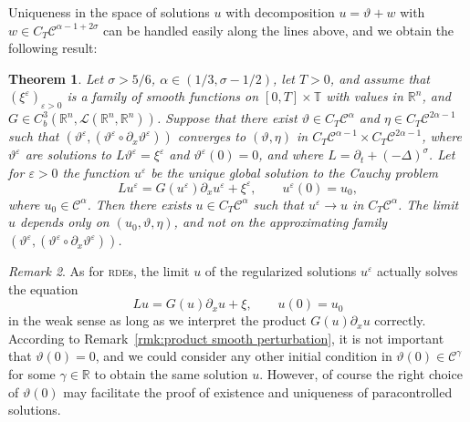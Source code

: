 \documentclass[11pt,a4paper]{article}
\newtheorem{theorem}{Theorem}[section]
\theoremstyle{remark}
\newtheorem{remark}[theorem]{Remark}
\newcommand{\R}{\mathbb{R}}
\newcommand{\Lcal}{\mathcal{L}}
\newcommand{\CC}{\ensuremath{\mathscr{C}}}
\begin{document}
Uniqueness in the space of solutions $u$ with decomposition $u= \vartheta +w$
with $w \in C_{T} \CC^{\alpha -1+2 \sigma}$ can be handled easily along the
lines above, and we obtain the following result:

\begin{theorem}\label{theorem:burgers existence uniqueness}
  Let $\sigma > 5/6$, $\alpha \in ( 1/3, \sigma -1/2 )$, let $T>0$,
  and assume that $( \xi^{\varepsilon} )_{\varepsilon >0}$ is a family of
  smooth functions on $[ 0,T ] \times \mathbb{T}$ with values in
  $\mathbb{R}^{n}$, and $G \in C^{3}_{b} ( \mathbb{R}^{n} ,\Lcal (\mathbb{R}^{n} ,\mathbb{R}^{n} ) )$. Suppose that there exist $\vartheta \in C_{T} \CC^{\alpha}$ and $\eta \in C_{T} \CC^{2 \alpha -1}$ such that $(\vartheta^{\varepsilon} , ( \vartheta^{\varepsilon} \circ   \partial_{x} \vartheta^{\varepsilon} ) )$ converges to $( \vartheta , \eta )$ in $C_{T}
  \CC^{\alpha -1} \times C_{T} \CC^{2 \alpha -1}$, where
  $\vartheta^{\varepsilon}$ are solutions to $L \vartheta^{\varepsilon} = \xi^{\varepsilon}$ and $\vartheta^{\varepsilon} ( 0 ) =0$, and where $L= \partial_{t} + ( - \Delta )^{\sigma}$. Let for $\varepsilon >0$ the function $u^{\varepsilon}$ be the unique global solution to the Cauchy problem
  \[
     L u^{\varepsilon} =G ( u^{\varepsilon} ) \partial_{x} u^{\varepsilon} + \xi^{\varepsilon} , \hspace{2em} u^{\varepsilon} ( 0 ) =u_{0} ,
  \]
  where $u_{0} \in \CC^{\alpha}$. Then there exists $u \in C_{T} \CC^{\alpha}$ such that $u^{\varepsilon} \rightarrow u$ in $C_{T} \CC^\alpha$. The limit $u$ depends only on $( u_{0} , \vartheta ,\eta )$, and not on the approximating family $( \vartheta^{\varepsilon} , (\vartheta^{\varepsilon} \circ   \partial_{x} \vartheta^{\varepsilon} ) )$.
\end{theorem}

\begin{remark}
  As for \textsc{rde}s, the limit $u$ of the regularized solutions $u^{\varepsilon}$ actually solves the equation
  \[
     L u=G ( u ) \partial_{x} u+ \xi , \hspace{2em} u ( 0 ) =u_{0}
  \]
  in the weak sense as long as we interpret the product $G ( u ) \partial_{x} u$ correctly. According to Remark~\ref{rmk:product smooth perturbation}, it is not important that $\vartheta(0) = 0$, and we could consider any other initial condition in $\vartheta(0) \in \CC^\gamma$ for some $\gamma \in \R$ to obtain the same solution $u$. However, of course the right choice of $\vartheta(0)$ may facilitate the proof of existence and uniqueness of paracontrolled solutions.%
\end{remark}
\end{document}
